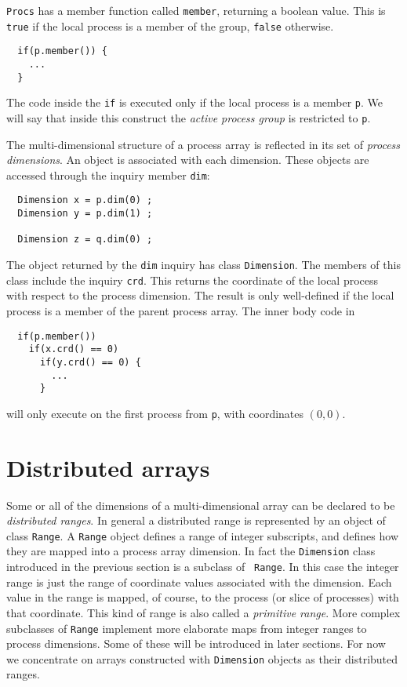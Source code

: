 {\tt Procs} has a member function called {\tt member}, returning
a boolean value.  This is {\tt true} if the local process is a member
of the group, {\tt false} otherwise.
\small
\begin{verbatim}
  if(p.member()) {
    ...
  }
\end{verbatim}
\normalsize
The code inside the {\tt if} is executed only if the
local process is a member {\tt p}.  We will say that inside this
construct the {\em active process group} is restricted to {\tt p}.

The multi-dimensional structure of a process array is reflected in
its set of {\em process dimensions}.  An object is associated
with each dimension.  These objects are accessed through the
inquiry member {\tt dim}:
\small
\begin{verbatim}
  Dimension x = p.dim(0) ;
  Dimension y = p.dim(1) ;

  Dimension z = q.dim(0) ;
\end{verbatim}
\normalsize
The object returned by the {\tt dim} inquiry has class {\tt Dimension}.
The members of this class include the inquiry {\tt crd}.  This
returns the coordinate of the local process with respect to the
process dimension.  The result is only well-defined if the local
process is a member of the parent process array.  The inner
body code in
\small
\begin{verbatim}
  if(p.member())
    if(x.crd() == 0)
      if(y.crd() == 0) {
        ...
      }
\end{verbatim}
\normalsize
will only execute on the first process from {\tt p}, with coordinates
$(0, 0)$.


\section{Distributed arrays\label{distArrays}}

Some or all of the dimensions of a multi-dimensional array can be
declared to be {\em distributed ranges}.  In general a distributed
range is represented by an object of class {\tt Range}.  A {\tt Range}
object defines a range of integer subscripts, and defines how they are mapped
into a process array dimension.  In fact the {\tt Dimension}
class introduced in the previous section is a subclass of {\tt
Range}.  In this case the integer range is just the range of coordinate
values associated with the dimension.  Each value in the range
is mapped, of course, to the process (or slice of processes) with
that coordinate.  This kind of range is also called a {\em primitive range}.
More complex subclasses of {\tt Range} implement more
elaborate maps from integer ranges to process dimensions.
Some of these will be introduced in later sections.  For now we concentrate
on arrays
constructed with {\tt Dimension} objects as their distributed ranges.

